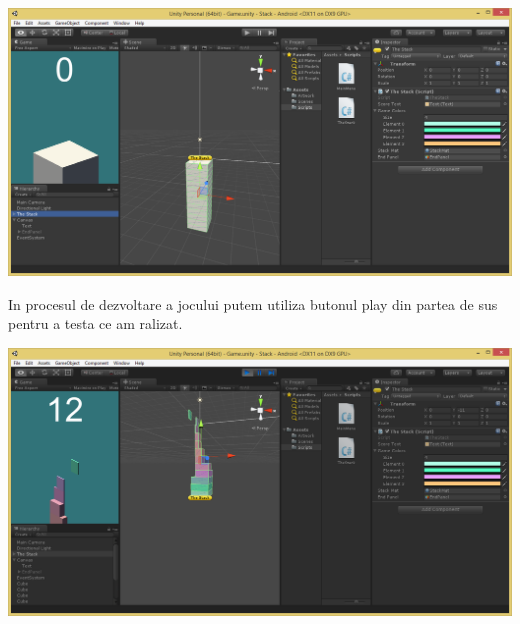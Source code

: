 \begin{center}
\includegraphics[scale=0.5]{images/TheStack}
\end{center}
In procesul de dezvoltare a jocului putem utiliza butonul play din partea de sus pentru a testa ce am ralizat.
\begin{center}
\includegraphics[scale=0.5]{images/Play}
\end{center}
